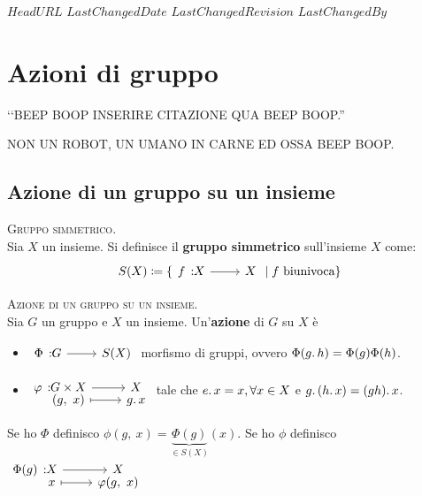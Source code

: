 \svnidlong
{$HeadURL$}
{$LastChangedDate$}
{$LastChangedRevision$}
{$LastChangedBy$}

\chapter{Azioni di gruppo}

\begin{introduction}
‘‘BEEP BOOP INSERIRE CITAZIONE QUA BEEP BOOP.''
\begin{flushright}
	\textsc{NON UN ROBOT,} UN UMANO IN CARNE ED OSSA BEEP BOOP.
\end{flushright}
\end{introduction}
\section{Azione di un gruppo su un insieme}
\begin{define}\textsc{Gruppo simmetrico.}\\
	Sia $X$ un insieme. Si definisce il \textbf{gruppo simmetrico} sull'insieme $X$ come:
	\begin{equation}
		S(X)\coloneqq \{\funz f X X \mid f \text{ biunivoca}\}
	\end{equation}
\vspace{-6mm}
\end{define}
\begin{define}\textsc{Azione di un gruppo su un insieme.}\\
	Sia $G$ un gruppo e $X$ un insieme. Un'\textbf{azione} di $G$ su $X$ è
		\begin{itemize}
			\item  $\funz \Phi G {S(X)}$ morfismo di gruppi, ovvero $\Phi(g\ldotp h)=\Phi(g)\Phi(h)$.
			\item $\funztot \phi {G\times X} X {(g,\ x)} {g\ldotp x}$ tale che $e\ldotp x=x, \forall x\in X$ e $g\ldotp (h\ldotp x)=(gh)\ldotp x$.
		\end{itemize}
	Se ho $\Phi$ definisco $\phi(g,\ x)=\underbrace{\Phi(g)}_{\in S(X)}(x)$.\newline
	Se ho $\phi$ definisco $\funztot {\Phi(g)} X X x {\phi(g,\ x)}$
\end{define}


